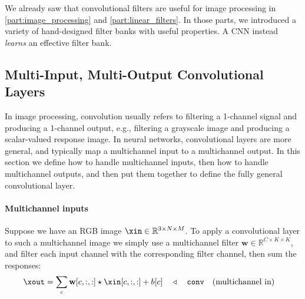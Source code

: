 We already saw that convolutional filters are useful for image processing in \partsref \ref{part:image_processing} and \ref{part:linear_filters}. In those parts, we introduced a variety of hand-designed filter banks with useful properties. A CNN instead \textit{learns} an effective filter bank.


\subsection{Multi-Input, Multi-Output Convolutional Layers}
In image processing, convolution usually refers to filtering a 1-channel signal and producing a 1-channel output, e.g., filtering a grayscale image and producing a scalar-valued response image. In neural networks, convolutional layers are more general, and typically map a multichannel input to a multichannel output. In this section we define how to handle multichannel inputs, then how to handle multichannel outputs, and then put them together to define the fully general convolutional layer.

\paragraph*{Multichannel inputs}

Suppose we have an RGB image $\xin \in \mathbb{R}^{3 \times N \times M}$. To apply a convolutional layer to such a multichannel image we simply use a multichannel filter $\mathbf{w} \in \mathbb{R}^{C \times K \times K}$, and filter each input channel with the corresponding filter channel, then sum the responses:
\begin{align}
    \xout = \sum_{c} \mathbf{w}[c,:,:] \star \xin[c,:,:] + b[c] & \quad \triangleleft \quad\texttt{conv}\quad \text{(multichannel in)}
\end{align}

